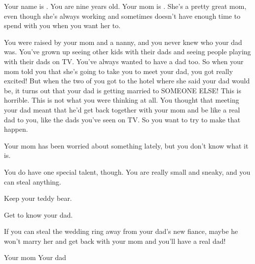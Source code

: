\documentclass[char]{guildcamp1}
\begin{document}
\name{\cKid{}}

Your name is \cKid{}. You are nine years old. Your mom is \cScientist{}. She's a pretty great mom, even though she's always working and sometimes doesn't have enough time to spend with you when you want her to. 

You were raised by your mom and a nanny, and you never knew who your dad was. You've grown up seeing other kids with their dads and seeing people playing with their dads on TV. You've always wanted to have a dad too. So when your mom told you that she's going to take you to meet your dad, you got really excited! But when the two of you got to the hotel where she said your dad would be, it turns out that your dad is getting married to SOMEONE ELSE! This is horrible. This is not what you were thinking at all. You thought that meeting your dad meant that he'd get back together with your mom and be like a real dad to you, like the dads you've seen on TV. So you want to try to make that happen. 

Your mom has been worried about something lately, but you don't know what it is. 

You do have one special talent, though. You are really small and sneaky, and you can steal anything. 

\begin{itemz}[Goals]
  \item Keep your teddy bear.
  \item Get to know your dad. 
  \item If you can steal the wedding ring away from your dad's new fiance, maybe he won't marry her and get back with your mom and you'll have a real dad!
\end{itemz}


\begin{contacts}
  \contact{\cScientist{}} Your mom 
  \contact{\cGroom{}} Your dad
\end{contacts}
\end{document}
